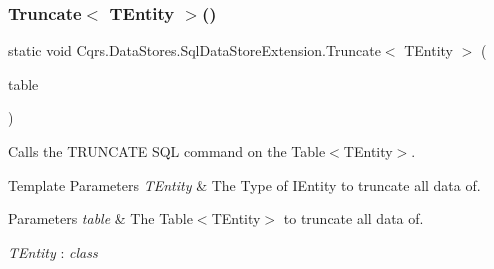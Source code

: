 \subsubsection{\texorpdfstring{Truncate$<$ T\+Entity $>$()}{Truncate< TEntity >()}}
{\footnotesize\ttfamily static void Cqrs.\+Data\+Stores.\+Sql\+Data\+Store\+Extension.\+Truncate$<$ T\+Entity $>$ (\begin{DoxyParamCaption}\item[{this Table$<$ T\+Entity $>$}]{table }\end{DoxyParamCaption})\hspace{0.3cm}{\ttfamily [static]}}



Calls the T\+R\+U\+N\+C\+A\+TE S\+QL command on the Table$<$\+T\+Entity$>$. 


\begin{DoxyTemplParams}{Template Parameters}
{\em T\+Entity} & The Type of I\+Entity to truncate all data of.\\
\hline
\end{DoxyTemplParams}

\begin{DoxyParams}{Parameters}
{\em table} & The Table$<$\+T\+Entity$>$ to truncate all data of.\\
\hline
\end{DoxyParams}
\begin{Desc}
\item[Type Constraints]\begin{description}
\item[{\em T\+Entity} : {\em class}]\end{description}
\end{Desc}
